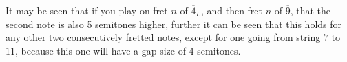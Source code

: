 \documentclass[preview]{standalone}
\begin{document}
\begin{center}
It may be seen that if you play on fret $n$ of $\overline{4}_L$, and then fret $n$ of $\overline{9}$, that the second note is also 5 semitones higher, further it can be seen that this holds for any other two consecutively fretted notes, except for one going from string $\overline{7}$ to $\overline{11}$, because this one will have a gap size of 4 semitones.
\end{center}
\end{document}
